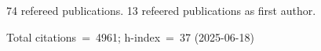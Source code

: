 74 refereed publications. 13 refeered publications as first author.

Total citations~=~4961; h-index~=~37 (2025-06-18)